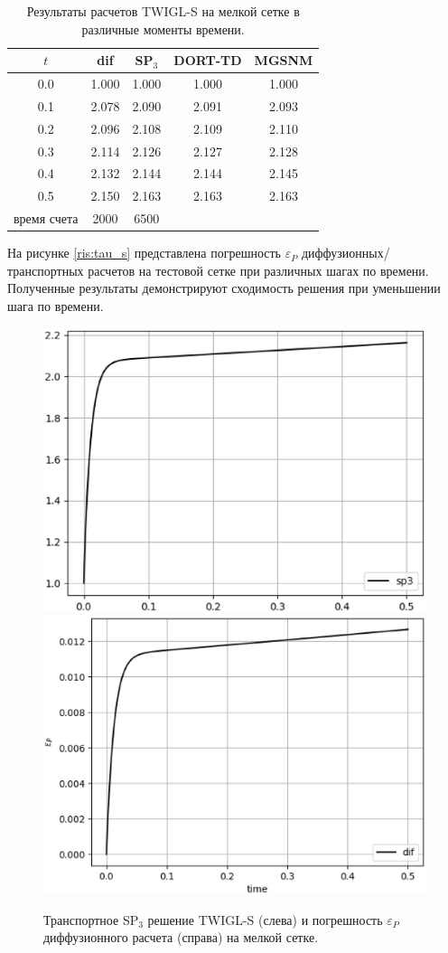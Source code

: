 \documentclass{crm-article}
\begin{document}
\begin{table}[ht]
\caption{Результаты расчетов TWIGL-S на мелкой сетке в различные моменты времени.}
\label{table:twigl-s}
\begin{center}
\begin{tabular}{c c c c c}
\hline
$t$ & dif & SP$_3$ & DORT-TD & MGSNM \\
\hline
0.0 & 1.000 & 1.000 & 1.000 & 1.000 \\
0.1 & 2.078 & 2.090 & 2.091 & 2.093 \\
0.2 & 2.096 & 2.108 & 2.109 & 2.110 \\
0.3 & 2.114 & 2.126 & 2.127 & 2.128 \\
0.4 & 2.132 & 2.144 & 2.144 & 2.145 \\
0.5 & 2.150 & 2.163 & 2.163 & 2.163 \\
\hline
время счета & 2000 & 6500  \\
\end{tabular}
\end{center}
\end{table}

На рисунке \ref{ris:tau_s} представлена погрешность $\varepsilon_P$ диффузионных/транспортных расчетов на тестовой сетке при различных шагах по времени. 
Полученные результаты демонстрируют сходимость решения при уменьшении шага по времени.

\begin{figure}[ht]
\begin{center}
	\includegraphics[width=0.4\linewidth]{sp3_ref_s.eps}\hspace{20pt}
	\includegraphics[width=0.4\linewidth]{odds_s.eps}\\
	\caption{\label{image:canonsummary} Транспортное SP$_3$ решение TWIGL-S (слева) и погрешность $\varepsilon_P$ диффузионного расчета (справа) на мелкой сетке.}
	\label{ris:sp3_ref_s}
\end{center}
\end{figure}
\end{document}
